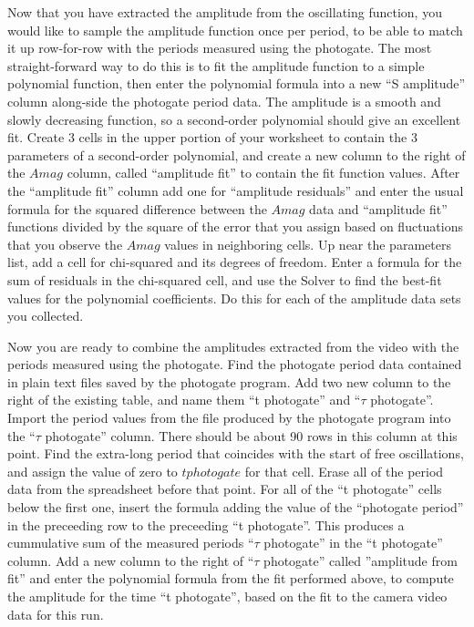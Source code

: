\documentclass{revtex4}
\begin{document}
Now that you have extracted the amplitude from the oscillating function,
you would like to sample the amplitude function once per period, to be
able to match it up row-for-row with the periods measured using the
photogate.  The most straight-forward way to do this is to fit the
amplitude function to a simple polynomial function, then enter the
polynomial formula into a new ``S amplitude'' column along-side the
photogate period data.  The amplitude is a smooth and slowly decreasing
function, so a second-order polynomial should give an excellent fit.
Create 3 cells in the upper portion of your worksheet to contain the
3 parameters of a second-order polynomial, and create a new column to
the right of the $Amag$ column, called ``amplitude fit'' to contain the
fit function values.  After the ``amplitude fit'' column add one for
``amplitude residuals'' and enter the usual formula for the squared
difference between the $Amag$ data and ``amplitude fit'' functions
divided by the square of the error that you assign based on fluctuations
that you observe the $Amag$ values in neighboring cells.  Up near the
parameters list, add a cell for chi-squared and its degrees of freedom.
Enter a formula for the sum of residuals in the chi-squared cell, and
use the Solver to find the best-fit values for the polynomial coefficients.
Do this for each of the amplitude data sets you collected.

Now you are ready to combine the amplitudes extracted from the video with
the periods measured using the photogate.  Find the photogate period data
contained in plain text files saved by the photogate program.
Add two new column to the right of the existing table, and name them
``t photogate'' and ``$\tau$ photogate''.   Import the period values from
the file produced by the photogate program into the ``$\tau$ photogate''
column.  There should be about 90 rows in this column at this point.
Find the extra-long period that coincides with the start of free 
oscillations, and assign the value of zero to $t photogate$ for that
cell.  Erase all of the period data from the spreadsheet before that point.
For all of the ``t photogate'' cells below the first one, insert the
formula adding the value of the ``photogate period'' in the preceeding
row to the preceeding ``t photogate''.  This produces a cummulative sum
of the measured periods ``$\tau$ photogate'' in the ``t photogate'' column.
Add a new column to the right of ``$\tau$ photogate'' called
''amplitude from fit'' and enter the polynomial formula from the fit
performed above, to compute the amplitude for the time ``t photogate'', 
based on the fit to the camera video data for this run.
\end{document}
